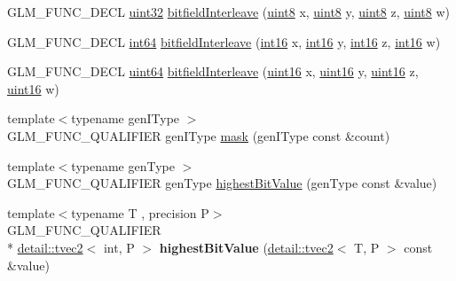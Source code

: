 \begin{DoxyCompactItemize}
\item 
G\-L\-M\-\_\-\-F\-U\-N\-C\-\_\-\-D\-E\-C\-L \hyperlink{group__gtc__type__precision_ga202b6a53c105fcb7e531f9b443518451}{uint32} \hyperlink{group__gtx__bit_ga447c0bbed9d60c14578626d8f03f3755}{bitfield\-Interleave} (\hyperlink{group__gtc__type__precision_ga1a7dcd8aac97cc8020817c94049deff2}{uint8} x, \hyperlink{group__gtc__type__precision_ga1a7dcd8aac97cc8020817c94049deff2}{uint8} y, \hyperlink{group__gtc__type__precision_ga1a7dcd8aac97cc8020817c94049deff2}{uint8} z, \hyperlink{group__gtc__type__precision_ga1a7dcd8aac97cc8020817c94049deff2}{uint8} w)
\item 
G\-L\-M\-\_\-\-F\-U\-N\-C\-\_\-\-D\-E\-C\-L \hyperlink{group__gtc__type__precision_ga435d75819cce297cc5fa21bd84ef89a5}{int64} \hyperlink{group__gtx__bit_ga09ee0be0fac790a1607a711e597dd9bf}{bitfield\-Interleave} (\hyperlink{group__gtc__type__precision_ga2945a61d12771f8954994fcddf02b021}{int16} x, \hyperlink{group__gtc__type__precision_ga2945a61d12771f8954994fcddf02b021}{int16} y, \hyperlink{group__gtc__type__precision_ga2945a61d12771f8954994fcddf02b021}{int16} z, \hyperlink{group__gtc__type__precision_ga2945a61d12771f8954994fcddf02b021}{int16} w)
\item 
G\-L\-M\-\_\-\-F\-U\-N\-C\-\_\-\-D\-E\-C\-L \hyperlink{group__gtc__type__precision_gae3632bf9b37da66233d78930dd06378a}{uint64} \hyperlink{group__gtx__bit_gac8a926a7bfd9b23c22a4f685193fbfe1}{bitfield\-Interleave} (\hyperlink{group__gtc__type__precision_gad8c2939e1fdd8e5828b31d95c52255d5}{uint16} x, \hyperlink{group__gtc__type__precision_gad8c2939e1fdd8e5828b31d95c52255d5}{uint16} y, \hyperlink{group__gtc__type__precision_gad8c2939e1fdd8e5828b31d95c52255d5}{uint16} z, \hyperlink{group__gtc__type__precision_gad8c2939e1fdd8e5828b31d95c52255d5}{uint16} w)
\item 
{\footnotesize template$<$typename gen\-I\-Type $>$ }\\G\-L\-M\-\_\-\-F\-U\-N\-C\-\_\-\-Q\-U\-A\-L\-I\-F\-I\-E\-R gen\-I\-Type \hyperlink{group__gtx__bit_ga79f1482a09c91f785e7e0ea8aed2b20e}{mask} (gen\-I\-Type const \&count)
\item 
{\footnotesize template$<$typename gen\-Type $>$ }\\G\-L\-M\-\_\-\-F\-U\-N\-C\-\_\-\-Q\-U\-A\-L\-I\-F\-I\-E\-R gen\-Type \hyperlink{group__gtx__bit_ga9621840252c293918780bc3890374b86}{highest\-Bit\-Value} (gen\-Type const \&value)
\item 
\hypertarget{namespaceglm_a4f75fd8e2634dcbac5c81ecb1f40a5be}{{\footnotesize template$<$typename T , precision P$>$ }\\G\-L\-M\-\_\-\-F\-U\-N\-C\-\_\-\-Q\-U\-A\-L\-I\-F\-I\-E\-R \\*
\hyperlink{structglm_1_1detail_1_1tvec2}{detail\-::tvec2}$<$ int, P $>$ {\bfseries highest\-Bit\-Value} (\hyperlink{structglm_1_1detail_1_1tvec2}{detail\-::tvec2}$<$ T, P $>$ const \&value)}\label{namespaceglm_a4f75fd8e2634dcbac5c81ecb1f40a5be}


\end{DoxyCompactItemize}
